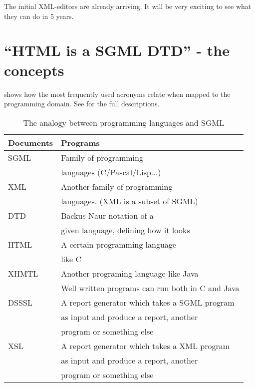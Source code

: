 The initial XML-editors are already arriving.  It will be very
exciting to see what they can do in 5 years.



\section{``HTML is a SGML DTD'' - the concepts}

 shows how the most
frequently used acronyms relate when mapped to the programming domain.
See  for the full descriptions.


\begin{table}[htbp]
  \begin{center}
    \begin{tabular}{|l|l|}
      \hline\hline
      \textbf{Documents} &  \textbf{Programs} \\
      \hline
      SGML &Family of programming \\
           & languages  (C/Pascal/Lisp...) \\
      \hline
      XML  & Another family of programming \\
           & languages. (XML is a subset of SGML) \\
      \hline
      DTD  & Backus-Naur notation of a \\
           & given language, defining how it looks\\
      \hline
      HTML & A certain programming language\\
           & like C \\
      \hline
      XHMTL & Another programing language like Java \\
           & Well written programs can run both in C and Java\\
      \hline
      DSSSL & A report generator which takes a SGML program \\
           & as input and produce a report, another\\
           & program or something else \\
      \hline
      XSL  & A report generator which takes a XML program \\
           & as input and produce a report, another\\
           & program or something else \\
      \hline
    \end{tabular}
    \caption{The analogy between programming languages and SGML}
    \label{tab:programming-langugages-and-html}
  \end{center}
\end{table}

